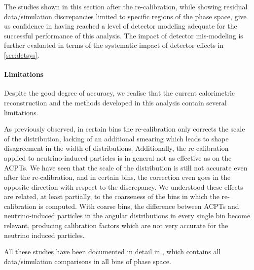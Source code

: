 
The studies shown in this section after the re-calibration, while showing residual data/simulation discrepancies limited to specific regions of the phase space, give us confidence in having reached a level of detector modeling adequate for the successful performance of this analysis. 
The impact of detector mis-modeling is further evaluated in terms of the systematic impact of detector effects in \ref{sec:detsys}.

\paragraph{Limitations}
Despite the good degree of accuracy, we realise that the current calorimetric reconstruction and the methods developed in this analysis contain several limitations.

As previously observed, in certain bins the re-calibration only corrects the scale of the distribution, lacking of an additional smearing which leads to shape disagreement in the width of \dedx distributions.
Additionally, the re-calibration applied to neutrino-induced particles is in general not as effective as on the ACPTs.
We have seen that the scale of the distribution is still not accurate even after the re-calibration, and in certain bins, the correction even goes in the opposite direction with respect to the discrepancy.
We understood these effects are related, at least partially, to the coarseness of the bins in which the re-calibration is computed.
With coarse bins, the difference between ACPTs and neutrino-induced particles in the angular distributions in every single bin become relevant, producing calibration factors which are not very accurate for the neutrino induced particles.

All these studies have been documented in detail in \cite{bib:pid_internal_note}, which contains all data/simulation comparisons in all bins of phase space.


